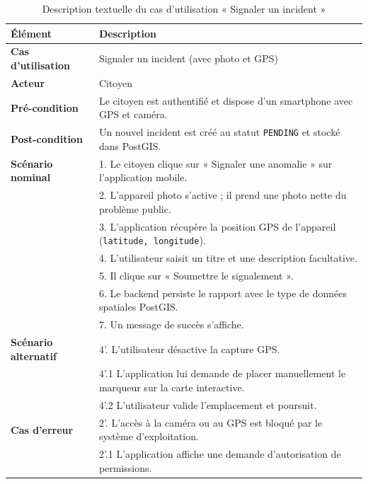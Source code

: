 \begin{table}[H]
    \centering
    \caption{Description textuelle du cas d'utilisation « Signaler un incident »}
    \label{tab:txt_ajouter_offre}
    \vspace{0.2cm}
    \small
    \begin{tabularx}{\textwidth}{|l|X|}
        \hline
        \textbf{Élément} & \textbf{Description} \\ \hline
        \textbf{Cas d’utilisation} & Signaler un incident (avec photo et GPS) \\ \hline
        \textbf{Acteur} & Citoyen \\ \hline
        \textbf{Pré-condition} & Le citoyen est authentifié et dispose d'un smartphone avec GPS et caméra. \\ \hline
        \textbf{Post-condition} & Un nouvel incident est créé au statut \texttt{PENDING} et stocké dans PostGIS. \\ \hline
        \textbf{Scénario nominal} &
        1. Le citoyen clique sur « Signaler une anomalie » sur l'application mobile.\\
        & 2. L'appareil photo s'active ; il prend une photo nette du problème public.\\
        & 3. L'application récupère la position GPS de l'appareil (\texttt{latitude, longitude}).\\
        & 4. L'utilisateur saisit un titre et une description facultative.\\
        & 5. Il clique sur « Soumettre le signalement ».\\
        & 6. Le backend persiste le rapport avec le type de données spatiales PostGIS.\\
        & 7. Un message de succès s'affiche. \\ \hline
        \textbf{Scénario alternatif} &
        4'. L'utilisateur désactive la capture GPS.\\
        & 4'.1 L'application lui demande de placer manuellement le marqueur sur la carte interactive.\\
        & 4'.2 L'utilisateur valide l'emplacement et poursuit. \\ \hline
        \textbf{Cas d’erreur} &
        2'. L'accès à la caméra ou au GPS est bloqué par le système d'exploitation.\\
        & 2'.1 L'application affiche une demande d'autorisation de permissions. \\ \hline
    \end{tabularx}
\end{table}

